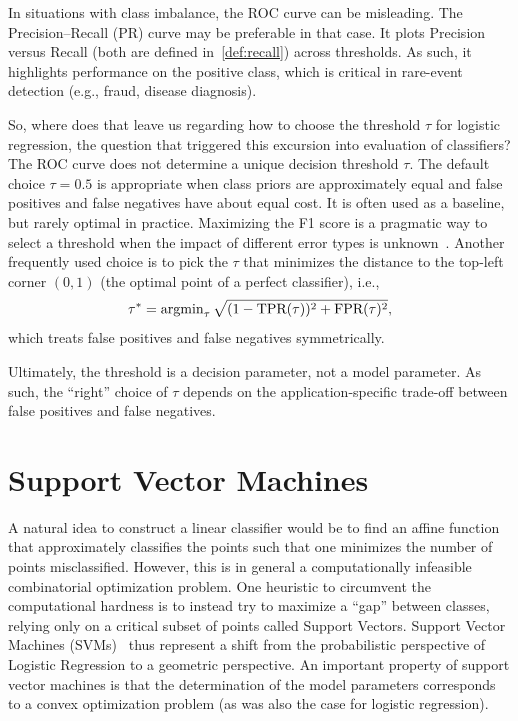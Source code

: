 In situations with class imbalance, the ROC curve can be misleading. The Precision–Recall (PR) curve may be preferable in that case. It plots Precision versus Recall (both are defined in~\eqref{def:recall}) across thresholds. As such, it highlights performance on the positive class, which is critical in rare-event detection (e.g., fraud, disease diagnosis).



\medskip
So, where does that leave us regarding how to choose the threshold $\tau$ for logistic regression, the question that triggered this excursion into evaluation of classifiers? The ROC curve does not determine a unique decision threshold $\tau$. The default choice $\tau = 0.5$ is appropriate when class priors are approximately equal and false positives and false negatives have about equal cost. It is often used as a baseline, but rarely optimal in practice.  Maximizing the F1 score is a pragmatic way to select a threshold when the impact of different error types is unknown~\cite{van2004geometry}.
Another frequently used choice is to pick the $\tau$ that minimizes the distance to the top-left corner $(0,1)$ (the optimal point of a perfect classifier), i.e.,
$$\tau^* = \operatorname{argmin}_{\tau} \sqrt{(1-\text{TPR}(\tau))^2 +
\text{FPR}(\tau)^2},$$
which treats false positives and false negatives symmetrically.


Ultimately, the threshold is a decision parameter, not a model parameter. As such,
the ``right'' choice of $\tau$ depends on the application-specific trade-off between false positives and false negatives.









\section{Support Vector Machines}\label{s:svm}


A natural idea to construct a linear classifier would be to find an affine function that approximately classifies the points such that one minimizes the number of points misclassified. However, this is in general a computationally infeasible combinatorial optimization problem.  One heuristic to circumvent the computational hardness is to instead try to maximize a ``gap'' between classes, relying only on a critical subset of points called Support Vectors. 
Support Vector Machines (SVMs)~\cite{cortes1995support} thus represent a shift from the probabilistic perspective of Logistic Regression to a geometric perspective. An important property of support vector machines is that the
determination of the model parameters corresponds to a convex optimization problem (as was also the case for logistic regression).

